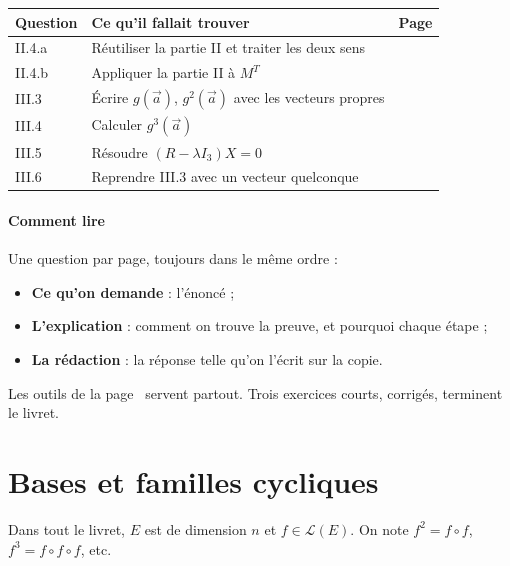 \documentclass[a4paper,11pt]{article}
\numberwithin{equation}{section}
\numberwithin{figure}{section}
\numberwithin{table}{section}
\newcommand{\grandnum}{\thesection}\newcommand{\ongletcouleur}{Bleu}
\theoremstyle{enonce}
\theoremstyle{exemple}
\theoremstyle{remarque}
\newif\ifonglets \ongletsfalse
\newcommand{\va}{\vec a}\newcommand{\vb}{\vec b}\newcommand{\vz}{\vec 0}\newcommand{\dd}[1]{\vec\delta_{#1}}
\begin{document}
\begin{center}
\small\renewcommand{\arraystretch}{1.3}
\begin{tabular}{@{}l>{\raggedright\arraybackslash}p{8.6cm}r@{}}
\toprule
\textbf{Question} & \textbf{Ce qu'il fallait trouver} & \textbf{Page}\\\midrule
II.4.a & Réutiliser la partie II et traiter les deux sens & \pageref{q:ii4a}\\
II.4.b & Appliquer la partie II à $M^T$ & \pageref{q:ii4b}\\
III.3 & Écrire $g(\va)$, $g^2(\va)$ avec les vecteurs propres & \pageref{q:iii3}\\
III.4 & Calculer $g^3(\va)$ & \pageref{q:iii4}\\
III.5 & Résoudre $(R-\lambda I_3)X=0$ & \pageref{q:iii5}\\
III.6 & Reprendre III.3 avec un vecteur quelconque & \pageref{q:iii6}\\\bottomrule
\end{tabular}
\end{center}

\paragraph{Comment lire} Une question par page, toujours dans le même ordre :
\begin{itemize}[leftmargin=1.2em,itemsep=2pt]
\item \textbf{Ce qu'on demande} : l'énoncé ;
\item \textbf{L'explication} : comment on trouve la preuve, et pourquoi chaque étape ;
\item \textbf{La rédaction} : la réponse telle qu'on l'écrit sur la copie.
\end{itemize}
Les outils de la page~\pageref{q:outils} servent partout. Trois exercices courts, corrigés, terminent le livret.

\vfill
\renewcommand{\contentsname}{Sommaire}
\hypertarget{toc}{}
\tableofcontents
\clearpage
\ongletstrue
\section{Bases et familles cycliques}\label{sec:dl}
\renewcommand{\grandnum}{1}

Dans tout le livret, $E$ est de dimension $n$ et $f\in\mathcal L(E)$. On note $f^2=f\circ f$, $f^3=f\circ f\circ f$, etc.
\end{document}
